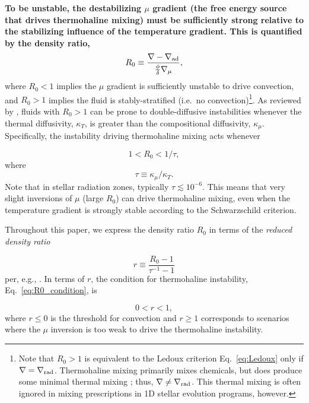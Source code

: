 \textbf{To be unstable, the destabilizing $\mu$ gradient (the free energy source that drives thermohaline mixing) must be sufficiently strong relative to the stabilizing influence of the temperature gradient. This is quantified by the density ratio,}
\begin{equation} \label{eq:R0}
    R_0 \equiv \frac{\grad - \gradad}{\frac{\phi}{\delta} \gradmu},
\end{equation}
where $R_0 < 1$ implies the $\mu$ gradient is sufficiently unstable to drive convection, and $R_0 > 1$ implies the fluid is stably-stratified (i.e.~no convection)\footnote{Note that $R_0>1$ is equivalent to the Ledoux criterion Eq.~\eqref{eq:Ledoux} only if $\nabla = \nabla_{\rm{rad}}$. Thermohaline mixing primarily mixes chemicals, but does produce some minimal thermal mixing \citep[see, e.g., Fig.~4 of][]{brown_etal_2013}; thus, $\nabla \neq \nabla_{\rm{rad}}$. This thermal mixing is often ignored in mixing prescriptions in 1D stellar evolution programs, however.}. 
As reviewed by \citet{garaud_DDC_review_2018}, fluids with $R_0 > 1$ can be prone to double-diffusive instabilities whenever the thermal diffusivity, $\kappa_T$, is greater than the compositional diffusivity, $\kappa_\mu$. Specifically, the instability driving thermohaline mixing acts whenever

\begin{equation} \label{eq:R0_condition}
1 < R_0 < 1/\tau,
\end{equation}
\citep{baines_gill_1969} where
\begin{equation} \label{eq:tau}
    \tau \equiv \kappa_\mu/\kappa_T.
\end{equation}
Note that in stellar radiation zones, typically $\tau \lesssim 10^{-6}$. This means that very slight inversions of $\mu$ (large $R_0$) can drive thermohaline mixing, even when the temperature gradient is strongly stable according to the Schwarzschild criterion. 

Throughout this paper, we express the density ratio $R_0$ in terms of the \textit{reduced density ratio}

\begin{equation} \label{eq:r}
    r \equiv \frac{R_0 - 1}{\tau^{-1} - 1}
\end{equation}
per, e.g., \citet{traxler_etal_2011,brown_etal_2013}.
In terms of $r$, the condition for thermohaline instability, Eq.~\eqref{eq:R0_condition}, is

\begin{equation} \label{eq:r_condition}
    0 < r < 1,
\end{equation}
where $r \leq 0$ is the threshold for convection and $r \geq 1$ corresponds to scenarios where the $\mu$ inversion is too weak to drive the thermohaline instability.